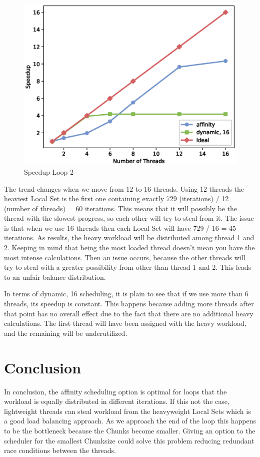 \documentclass[12pt,a4paper]{article}
\newcommand{\sectionVspacing}{\vspace{15pt}}
\begin{document}
\begin{figure}[ht]
	\centering
	\includegraphics[scale=0.6]{../graphs/loop2_speedup.eps}
	\caption{Speedup Loop 2}
	\label{speedupLoop2}
\end{figure}

The trend changes when we move from 12 to 16 threads. Using 12 threads the heaviest Local Set is the first one containing exactly 729 (iterations) / 12 (number of threads) = 60 iterations. This means that it will possibly be the thread with the slowest progress, so each other will try to steal from it. The issue is that when we use 16 threads then each Local Set will have 729 / 16 = 45 iterations. As results, the heavy workload will be distributed among thread 1 and 2. Keeping in mind that being the most loaded thread doesn't mean you have the most intense calculations. Then an issue occurs, because the other threads will try to steal with a greater possibility from other than thread 1 and 2. This leads to an unfair balance distribution.

In terms of dynamic, 16 scheduling, it is plain to see that if we use more than 6 threads, its speedup is constant. This happens because adding more threads after that point has no overall effect due to the fact that there are no additional heavy calculations. The first thread will have been assigned with the heavy workload, and the remaining will be underutilized.

\sectionVspacing

\section{Conclusion}
In conclusion, the affinity scheduling option is optimal for loops that the workload is equally distributed in different iterations. If this not the case, lightweight threads can steal workload from the heavyweight Local Sets which is a good load balancing approach. As we approach the end of the loop this happens to be the bottleneck because the Chunks become smaller. Giving an option to the scheduler for the smallest Chunksize could solve this problem reducing redundant race conditions between the threads.
\end{document}
